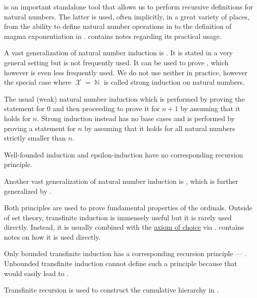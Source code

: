 \begin{remark}
\begin{thmenum}
     is an important standalone tool that allows us to perform recursive definitions for natural numbers. The latter is used, often implicitly, in a great variety of places, from the ability to define natural number operations in  to the definition of magma exponentiation in .  contains notes regarding its practical usage.

     A vast generalization of natural number induction is . It is stated in a very general setting but is not frequently used. It can be used to prove , which however is even less frequently used. We do not use neither in practice, however the special case where \( \mscrX = \BbbN \) is called strong induction on natural numbers.

    The usual (weak) natural number induction which is performed by proving the statement for \( 0 \) and then proceeding to prove it for \( n + 1 \) by assuming that it holds for \( n \). Strong induction instead has no base cases and is performed by proving a statement for \( n \) by assuming that it holds for all natural numbers strictly smaller than \( n \).

    Well-founded induction and epsilon-induction have no corresponding recursion principle.

     Another vast generalization of natural number induction is , which is further generalized by .

    Both principles are used to prove fundamental properties of the ordinals. Outside of set theory, transfinite induction is immensely useful but it is rarely used directly. Instead, it is usually combined with the \hyperref[def:zfc/choice]{axiom of choice} via .  contains notes on how it is used directly.

    Only bounded transfinite induction has a corresponding recursion principle --- . Unbounded transfinite induction cannot define such a principle because that would easily lead to .

    Transfinite recursion is used to construct the cumulative hierarchy in .


\end{thmenum}
\end{remark}
